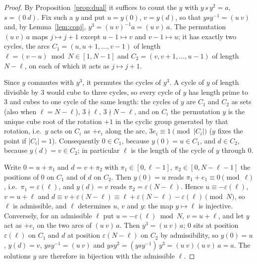 \begin{thm}[first moment]
\begin{proof}
By Proposition~\ref{prop:dual} it suffices to count the $y$ with $y\,s\,y^{2}=a$, $s=(0\ d)$. Fix such a $y$ and put $u=y(0)$, $v=y(d)$,
so that $ysy^{-1}=(u\ v)$ and, by Lemma~\ref{lem:conj}, $y^{3}=(u\ v)^{-1}a=(u\ v)\,a$. The permutation $(u\ v)\,a$ maps $j\mapsto j+1$
except $u-1\mapsto v$ and $v-1\mapsto u$; it has exactly two cycles, the arcs $C_1=(u,u+1,\dots,v-1)$ of length $\ell=(v-u)\bmod N\in[1,N-1]$
and $C_2=(v,v+1,\dots,u-1)$ of length $N-\ell$, on each of which it acts as $j\mapsto j+1$.

Since $y$ commutes with $y^{3}$, it permutes the cycles of $y^{3}$. A cycle of $y$ of length divisible by $3$ would cube to three cycles,
so every cycle of $y$ has length prime to $3$ and cubes to one cycle of the same length: the cycles of $y$ are $C_1$ and $C_2$ as sets
(also when $\ell=N-\ell$), $3\nmid\ell$, $3\nmid N-\ell$, and on $C_i$ the permutation $y$ is the unique cube root of the rotation $+1$ in
the cyclic group generated by that rotation, i.e.\ $y$ acts on $C_i$ as $+e_i$ along the arc, $3e_i\equiv1\pmod{|C_i|}$ ($y$ fixes the
point if $|C_i|=1$). Consequently $0\in C_1$, because $y(0)=u\in C_1$, and $d\in C_2$, because $y(d)=v\in C_2$; in particular $\ell$ is the
length of the cycle of $y$ through $0$.

Write $0=u+\pi_1$ and $d=v+\pi_2$ with $\pi_1\in[0,\ell-1]$, $\pi_2\in[0,N-\ell-1]$ the positions of $0$ on $C_1$ and of $d$ on $C_2$.
Then $y(0)=u$ reads $\pi_1+e_1\equiv0\pmod\ell$, i.e.\ $\pi_1=\varepsilon(\ell)$, and $y(d)=v$ reads $\pi_2=\varepsilon(N-\ell)$. Hence
$u\equiv-\varepsilon(\ell)$, $v=u+\ell$ and $d\equiv v+\varepsilon(N-\ell)\equiv\ell+\varepsilon(N-\ell)-\varepsilon(\ell)\pmod N$, so $\ell$
is admissible, and $\ell$ determines $u$, $v$ and $y$: the map $y\mapsto\ell$ is injective. Conversely, for an admissible $\ell$ put
$u=-\varepsilon(\ell)\bmod N$, $v=u+\ell$, and let $y$ act as $+e_i$ on the two arcs of $(u\ v)\,a$. Then $y^{3}=(u\ v)\,a$; $0$ sits at
position $\varepsilon(\ell)$ on $C_1$ and $d$ at position $\varepsilon(N-\ell)$ on $C_2$ by admissibility, so $y(0)=u$, $y(d)=v$,
$ysy^{-1}=(u\ v)$ and $ysy^{2}=(ysy^{-1})\,y^{3}=(u\ v)(u\ v)\,a=a$. The solutions $y$ are therefore in bijection with the admissible $\ell$.
\end{proof}


\end{thm}
